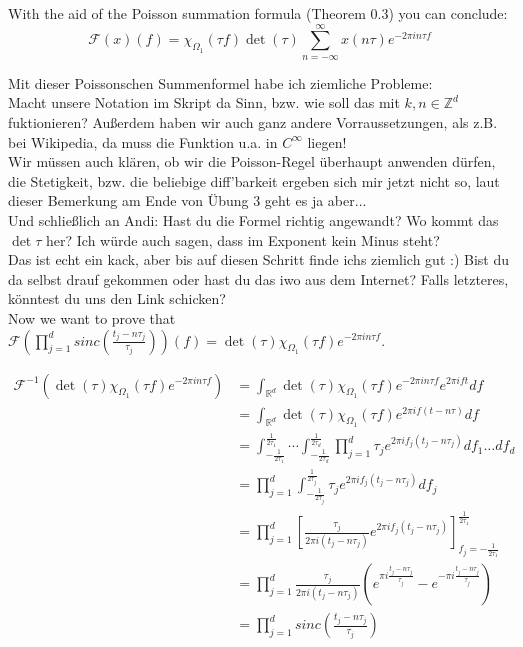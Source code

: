 \documentclass[a4paper, 11pt]{scrreprt}
\newcommand{\RR}{\mathbb{R}}
\newcommand{\ZZ}{\mathbb{Z}}
\newcommand{\FF}{\mathcal{F}}
\begin{document}
With the aid of the Poisson summation formula (Theorem 0.3) you can conclude:
\begin{equation}
\FF(x)(f) = \chi_{\Omega_1}(\tau f) \det(\tau) \sum_{n=-\infty}^\infty x(n\tau)e^{-2\pi i n\tau f}
\end{equation}

Mit dieser Poissonschen Summenformel habe ich ziemliche Probleme:\\
Macht unsere Notation im Skript da Sinn, bzw. wie soll das mit \(k,n \in \ZZ^d\) fuktionieren? Außerdem haben wir auch ganz andere Vorraussetzungen, als z.B. bei Wikipedia, da muss die Funktion u.a. in \(C^{\infty}\) liegen! \\
Wir müssen auch klären, ob wir die Poisson-Regel überhaupt anwenden dürfen, die Stetigkeit, bzw. die beliebige diff'barkeit ergeben sich mir jetzt nicht so, laut dieser Bemerkung am Ende von Übung 3 geht es ja aber...\\
Und schließlich an Andi: Hast du die Formel richtig angewandt? Wo kommt das \(\det{\tau}\) her? Ich würde auch sagen, dass im Exponent kein Minus steht? \\
Das ist echt ein kack, aber bis auf diesen Schritt finde ichs ziemlich gut :) Bist du da selbst drauf gekommen oder hast du das iwo aus dem Internet? Falls letzteres, könntest du uns den Link schicken?\\


Now we want to prove that \(\FF\left( \prod_{j=1}^d sinc \left( \frac{t_j-n\tau_j}{\tau_j}\right)\right)(f) = \det(\tau)\chi_{\Omega_1}(\tau f)e^{-2\pi in\tau f}\).

\begin{align*}
\FF^{-1}\left( \det(\tau) \chi_{\Omega_1}(\tau f) e^{-2 \pi i n \tau f}\right) 
&= \int_{\RR^d} \det(\tau) \chi_{\Omega_1}(\tau f) e^{-2 \pi i n \tau f} e^{2 \pi i f t} df \\
&= \int_{\RR^d} \det(\tau) \chi_{\Omega_1}(\tau f) e^{2 \pi i f (t-n\tau) }df \\
&= \int_{-\frac{1}{2\tau_1}}^{\frac{1}{2\tau_1}} \cdots \int_{-\frac{1}{2\tau_d}}^{\frac{1}{2\tau_d}} \prod_{j=1}^d \tau_j e^{2 \pi i f_j(t_j-n \tau_j)}df_1 \ldots df_d \\
&= \prod_{j=1}^d \int_{-\frac{1}{2\tau_j}}^{\frac{1}{2\tau_j}} \tau_j e^{2 \pi i f_j (t_j - n \tau_j)}df_j \\
&= \prod_{j=1}^d \left[  \frac{\tau_j}{2 \pi i (t_j - n \tau_j)} e^{2 \pi i f_j (t_j - n \tau_j)} \right]_{f_j = -\frac{1}{2\tau_1}}^{\frac{1}{2\tau_1}} \\
&= \prod_{j=1}^d \frac{\tau_j}{2 \pi i (t_j - n \tau_j)} \left( e^{\pi i \frac{t_j - n \tau_j}{\tau_j}} - e^{-\pi i \frac{t_j - n \tau_j}{\tau_j}} \right) \\
&= \prod_{j=1}^d sinc \left( \frac{t_j - n \tau_j}{\tau_j} \right)
\end{align*}
\end{document}
